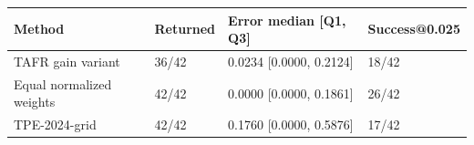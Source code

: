 \begin{tabular}{llll}
\toprule
Method & Returned & Error median [Q1, Q3] & Success@0.025 \\
\midrule
TAFR gain variant & 36/42 & 0.0234 [0.0000, 0.2124] & 18/42 \\
Equal normalized weights & 42/42 & 0.0000 [0.0000, 0.1861] & 26/42 \\
TPE-2024-grid & 42/42 & 0.1760 [0.0000, 0.5876] & 17/42 \\
\bottomrule
\end{tabular}
